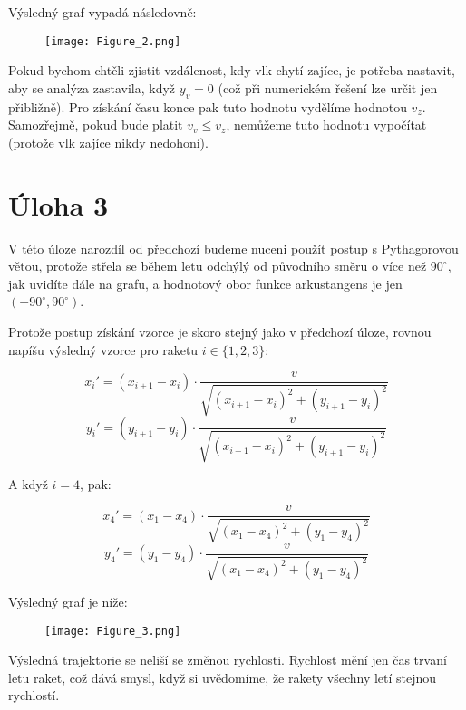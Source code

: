 \documentclass{fkssolpub}
\begin{document}
\clearpage

Výsledný graf vypadá následovně:

\begin{figure}[h]
  \texttt{[image: Figure\_2.png]}
  \centering
\end{figure}

Pokud bychom chtěli zjistit vzdálenost, kdy vlk chytí zajíce, je potřeba
nastavit, aby se analýza zastavila, když $y_v = 0$ (což při numerickém
řešení lze určit jen přibližně). Pro získání
času konce pak tuto hodnotu vydělíme hodnotou $v_z$. Samozřejmě, pokud bude 
platit $v_v \leq v_z$, nemůžeme tuto hodnotu vypočítat (protože vlk zajíce
nikdy nedohoní).


\clearpage
\section{Úloha 3}

V této úloze narozdíl od předchozí budeme nuceni použít postup s
Pythagorovou větou, protože střela se během letu
odchýlý od původního směru o více než $90^{\circ}$, jak uvidíte dále na grafu, 
a hodnotový obor funkce arkustangens je jen $(-90^{\circ}, 90^{\circ})$.

Protože postup získání vzorce je skoro stejný jako v předchozí úloze,
rovnou napíšu výsledný vzorce pro raketu $i \in \{1,2,3\}$:

\[
  x_i' = (x_{i+1} - x_i) \cdot \frac{v}{\sqrt{(x_{i+1} - x_i)^2 + (y_{i+1} - y_i)^2}}
\]
\[
  y_i' = (y_{i+1} - y_i) \cdot \frac{v}{\sqrt{(x_{i+1} - x_i)^2 + (y_{i+1} - y_i)^2}}
\]

A když $i = 4$, pak:

\[
  x_4' = (x_1 - x_4) \cdot \frac{v}{\sqrt{(x_1 - x_4)^2 + (y_1 - y_4)^2}}
\]
\[
  y_4' = (y_1 - y_4) \cdot \frac{v}{\sqrt{(x_1 - x_4)^2 + (y_1 - y_4)^2}}
\]

Výsledný graf je níže:

\begin{figure}[h]
  \texttt{[image: Figure\_3.png]}
  \centering
\end{figure}

Výsledná trajektorie se neliší se změnou rychlosti. Rychlost mění jen
čas trvaní letu raket, což dává smysl, když si uvědomíme, že rakety
všechny letí stejnou rychlostí.
\end{document}
